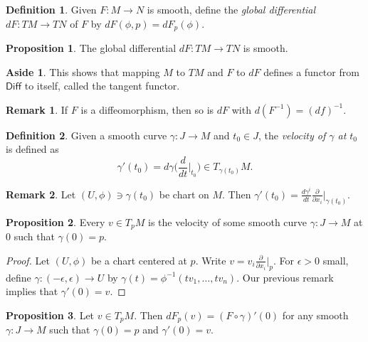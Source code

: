 \documentclass[10pt,letterpaper,cm]{nupset}
\theoremstyle{definition}
\newtheorem*{definition}{Definition}
\newtheorem{remark}{Remark}
\newtheorem*{aside}{Aside}
\newtheorem{prop}{Proposition}
\newcommand{\1}{\mathbf{1}}
\newcommand{\0}{\vec 0}
\begin{document}
\begin{definition}
Given $F: M \to N$ is smooth, define the \textit{global differential} $dF: TM \to TN$ of $F$ by $dF(\phi, p) = dF_p(\phi)$.
\end{definition}

\begin{prop}
The global differential $dF: TM \to TN$ is smooth.
\end{prop}

\begin{aside}
This shows that mapping $M$ to $TM$ and $F$ to $dF$ defines a functor from $\mathsf{Diff}$ to itself, called the tangent functor.
\end{aside}

\begin{remark}
If $F$ is a diffeomorphism, then so is $dF$ with $d(F^{-1}) = (df)^{-1}$.
\end{remark}

\begin{definition}
Given a smooth curve $\gamma : J \to M$ and $t_0 \in J$, the \textit{velocity of $\gamma$ at $t_0$} is defined as $$\gamma'(t_0) = d\gamma \big(\frac{d}{dt}\vert_{t_0} \big) \in T_{\gamma(t_0)}M.$$
\end{definition}

\begin{remark}
Let $(U, \phi) \ni \gamma(t_0)$ be chart on $M$. Then $\gamma'(t_0) = \frac{d\gamma^i}{dt} \frac{\partial}{\partial{x_i}}\vert_{\gamma(t_0)}$.
\end{remark}

\begin{prop}
Every $v \in T_pM$ is the velocity of some smooth curve $\gamma : J \to M$ at $0$ such that $\gamma(0)=p$.
\end{prop}
\begin{proof}
Let $(U, \phi)$ be a chart centered at $p$. Write $v = v_i \frac{\partial}{\partial{x_i}}\vert_{p}$. For $\epsilon >0$ small, define $\gamma: (-\epsilon , \epsilon) \to U$ by $\gamma(t) = \phi^{-1}(tv_1, \ldots, tv_n)$. Our previous remark implies that $\gamma'(0) = v$.
\end{proof}

\begin{prop}
Let $v \in T_pM$. Then $dF_p(v) = (F \circ \gamma)'(0)$ for any smooth $\gamma : J \to M$ such that $\gamma(0)=p$ and $\gamma'(0) =v$.
\end{prop}
\end{document}
